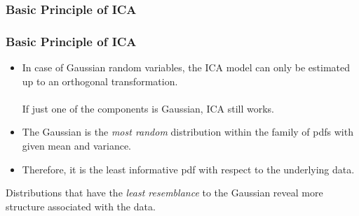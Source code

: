 \begin{frame}
  \frametitle{Basic Principle of ICA \cont}


  \begin{center}
  \end{center}
\end{frame}


\begin{frame}
  \frametitle{Basic Principle of ICA \cont}

   \pause 

  \begin{itemize}
    \item In case of Gaussian random variables, the ICA model can only be estimated up to an orthogonal transformation. \\[0.25cm]
      \\
      \quad If just one of the components is Gaussian, ICA still works. \\[0.25cm] \pause
    \item The Gaussian is the \textit{most random} distribution within the family of pdfs with given mean and variance. \pause 
    \item Therefore, it is the least informative pdf with respect to the underlying data.
  \end{itemize}
  \pspread

  Distributions that have the \textit{least resemblance} to the Gaussian reveal more structure associated with the data.
\end{frame}


